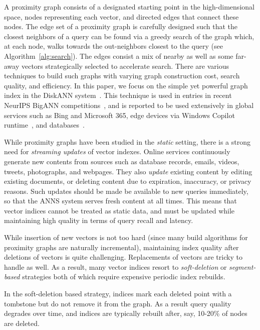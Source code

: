A proximity graph consists of a designated starting point in the high-dimensional space,
nodes representing each vector, and directed edges that connect these nodes. 
The edge set of a proximity graph is carefully designed such that the closest neighbors of 
a query can be found via a greedy search of the graph which, at each node, walks towards
the out-neighbors closest to the query (see Algorithm~\ref{alg:search}).
The edges consist a mix of nearby as well as some far-away vectors strategically selected to accelerate search.
There are various techniques to build such graphs with varying graph construction cost,
search quality, and efficiency. 
In this paper, we focus on the simple yet powerful graph index in the DiskANN system~\cite{DiskANN19, diskann-github}.
This technique is used in entries in recent NeurIPS BigANN competitions~\cite{bigann21, bigann23},
and is reported to be used extensively in global services such as Bing and Microsoft 365,
edge devices via Windows Copilot runtime~\cite{windowscopilot},
and databases~\cite{cosmosdb, pgvectorscale, JVector}.

 
While proximity graphs have been studied in the \emph{static} setting,
there is a strong need for \emph{streaming updates} of vector indexes. 
Online services continuously generate new contents from sources such as
 database records, emails, videos, tweets, photographs, and webpages. 
They also \emph{update} existing content by editing 
existing documents, or deleting content due to expiration, inaccuracy, or privacy reasons. 
Such updates should be made be available to new queries immediately,
so that the ANNS system serves fresh content at all times. 
This means that vector indices cannot be treated as static data,
and must be updated while maintaining high quality in terms of query recall and latency.


While insertion of new vectors is not too hard 
(since many build algorithms for proximity graphs
are naturally incremental),
maintaining index quality after deletions 
of vectors is quite challenging.
Replacements of vectors are tricky to handle as well.
As a result, many vector indices resort to \emph{soft-deletion} or \emph{segment-based} strategies
both of which require expensive periodic index rebuilds.

In the soft-deletion based strategy, indices mark each deleted point with a tombstone but do not
remove it from the graph. As a result query quality degrades over time, and indices
are typically rebuilt after, say, 10-20\% of nodes are deleted. 

